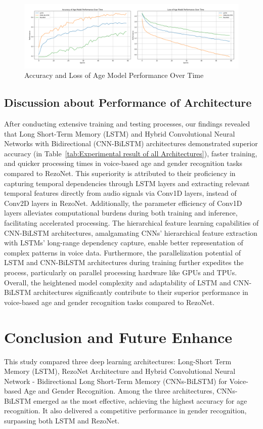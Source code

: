 \documentclass[conference, 10pt,onecolumn]{IEEEtran}
\begin{document}
\begin{figure}
    \centering
    \includegraphics[width=7 in]{Age Model.pdf}
    \caption{Accuracy and Loss of Age Model Performance Over Time}
    \label{fig:Age_valid}
\end{figure}
\subsection{Discussion about Performance of Architecture}

After conducting extensive training and testing processes, our findings revealed that Long Short-Term Memory (LSTM) and Hybrid Convolutional Neural Networks with Bidirectional (CNN-BiLSTM) architectures demonstrated superior accuracy (in Table~\ref{tab:Experimental result of all Architectures}), faster training, and quicker processing times in voice-based age and gender recognition tasks compared to RezoNet. This superiority is attributed to their proficiency in capturing temporal dependencies through LSTM layers and extracting relevant temporal features directly from audio signals via Conv1D layers, instead of Conv2D layers in RezoNet. Additionally, the parameter efficiency of Conv1D layers alleviates computational burdens during both training and inference, facilitating accelerated processing. The hierarchical feature learning capabilities of CNN-BiLSTM architectures, amalgamating CNNs' hierarchical feature extraction with LSTMs' long-range dependency capture, enable better representation of complex patterns in voice data. Furthermore, the parallelization potential of LSTM and CNN-BiLSTM architectures during training further expedites the process, particularly on parallel processing hardware like GPUs and TPUs. Overall, the heightened model complexity and adaptability of LSTM and CNN-BiLSTM architectures significantly contribute to their superior performance in voice-based age and gender recognition tasks compared to RezoNet.

\section{Conclusion and Future Enhance}
This study compared three deep learning architectures: Long-Short Term Memory (LSTM), RezoNet Architecture and Hybrid Convolutional Neural Network - Bidirectional Long Short-Term Memory (CNNs-BiLSTM) for Voice-based Age and Gender Recognition. Among the three architectures, CNNs-BiLSTM emerged as the most effective, achieving the highest accuracy for age recognition. It also delivered a competitive performance in gender recognition, surpassing both LSTM and RezoNet.
\end{document}
